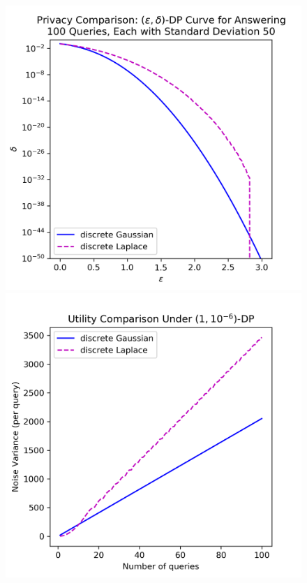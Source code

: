 \documentclass{jpc}
\begin{document}
\begin{figure}[ht!]
    \centering
    \begin{minipage}{0.5\textwidth}
        \includegraphics[width=\textwidth]{gausslaplace_epsdelta.png}
    \end{minipage}
    \hspace{-10pt}
    \begin{minipage}{0.5\textwidth}
        \includegraphics[width=\textwidth]{gausslaplace_kvar.png}

\end{minipage}
\end{figure}
\end{document}

